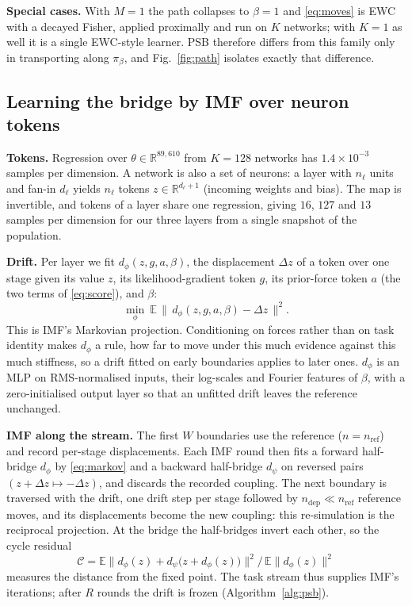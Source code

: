 \documentclass{article}
\newcommand{\Rb}{\mathbb{R}}
\newcommand{\Eb}{\mathbb{E}}
\begin{document}
\textbf{Special cases.} With $M=1$ the path collapses to $\beta=1$ and
\eqref{eq:moves} is EWC with a decayed Fisher, applied proximally and run on
$K$ networks; with $K=1$ as well it is a single EWC-style learner. PSB therefore
differs from this family only in transporting along $\pi_\beta$, and
Fig.~\ref{fig:path} isolates exactly that difference.

\subsection{Learning the bridge by IMF over neuron tokens}
\label{sec:imf}

\textbf{Tokens.} Regression over $\theta\in\Rb^{89{,}610}$ from $K=128$ networks
has $1.4\times10^{-3}$ samples per dimension. A network is also a set of
neurons: a layer with $n_\ell$ units and fan-in $d_\ell$ yields $n_\ell$ tokens
$z\in\Rb^{d_\ell+1}$ (incoming weights and bias). The map is invertible, and
tokens of a layer share one regression, giving $16$, $127$ and $13$ samples per
dimension for our three layers from a single snapshot of the population.

\textbf{Drift.} Per layer we fit $d_\phi(z,g,a,\beta)$, the displacement
$\Delta z$ of a token over one stage given its value $z$, its likelihood-gradient
token $g$, its prior-force token $a$ (the two terms of \eqref{eq:score}), and
$\beta$:
\begin{equation}
\min_\phi\ \Eb\,\big\|\,d_\phi(z,g,a,\beta)-\Delta z\,\big\|^2 .
\label{eq:markov}
\end{equation}
This is IMF's Markovian projection. Conditioning on forces rather than on task
identity makes $d_\phi$ a rule, how far to move under this much evidence against
this much stiffness, so a drift fitted on early boundaries applies to later
ones. $d_\phi$ is an MLP on RMS-normalised inputs, their log-scales and Fourier
features of $\beta$, with a zero-initialised output layer so that an unfitted
drift leaves the reference unchanged.

\textbf{IMF along the stream.} The first $W$ boundaries use the reference
($n=n_{\mathrm{ref}}$) and record per-stage displacements. Each IMF round then
fits a forward half-bridge $d_\phi$ by \eqref{eq:markov} and a backward
half-bridge $d_\psi$ on reversed pairs $(z{+}\Delta z\mapsto-\Delta z)$, and
discards the recorded coupling. The next boundary is traversed with the drift,
one drift step per stage followed by $n_{\mathrm{dep}}\ll n_{\mathrm{ref}}$
reference moves, and its displacements become the new coupling: this
re-simulation is the reciprocal projection. At the bridge the half-bridges
invert each other, so the cycle residual
\begin{equation}
\mathcal{C}=\Eb\big\|d_\phi(z)+d_\psi\big(z+d_\phi(z)\big)\big\|^2\big/\,\Eb\|d_\phi(z)\|^2
\label{eq:cycle}
\end{equation}
measures the distance from the fixed point. The task stream thus supplies IMF's
iterations; after $R$ rounds the drift is frozen (Algorithm~\ref{alg:psb}).
\end{document}
